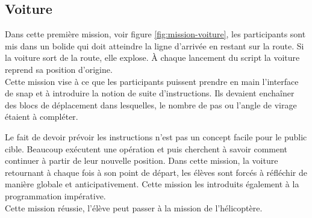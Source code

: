 %

\subsection{Voiture}
\label{mission-voiture}
Dans cette première mission, voir figure \ref{fig:mission-voiture}, les participants sont mis dans un bolide qui doit atteindre la ligne d'arrivée en restant sur la route. Si la voiture sort de la route, elle explose. À chaque lancement du \gls{script} la voiture reprend sa position d'origine.\\

Cette mission vise à ce que les participants puissent prendre en main l'interface de \gls{snap} et à introduire la notion de suite d'instructions. Ils devaient enchaîner des \glspl{bloc} de déplacement dans lesquelles, le nombre de pas ou l'angle de virage étaient à compléter.

Le fait de devoir prévoir les instructions n'est pas un concept facile pour le public cible. Beaucoup exécutent une opération et puis cherchent à savoir comment continuer à partir de leur nouvelle position. Dans cette mission, la voiture retournant à chaque fois à son point de départ, les élèves sont forcés à réfléchir de manière globale et anticipativement. Cette mission les introduits également à la programmation impérative.\\

Cette mission réussie, l'élève peut passer à la mission de l'hélicoptère.

